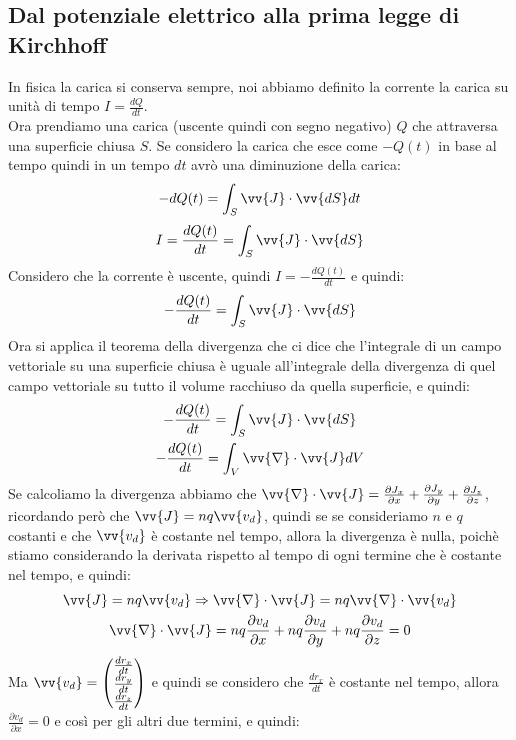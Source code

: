 \documentclass[a4paper, oneside]{article}
\begin{document}
\subsection{Dal potenziale elettrico alla prima legge di Kirchhoff}
In fisica la carica si conserva sempre, noi abbiamo definito la corrente la carica su unità di tempo $I = \frac{dQ}{dt}$.\\
Ora prendiamo una carica (uscente quindi con segno negativo) $Q$ che attraversa una superficie chiusa $S$.
Se considero la carica che esce come $-Q(t)$ in base al tempo quindi in un tempo $dt$ avrò una diminuzione della carica:
\begin{gather*}
    -dQ(t) = \int_S \vv{J} \cdot \vv{dS} dt
\end{gather*}
\begin{gather*}
    I = \frac{dQ(t)}{dt} = \int_S \vv{J} \cdot \vv{dS}
\end{gather*}
Considero che la corrente è uscente, quindi $I = -\frac{dQ(t)}{dt}$ e quindi:
\begin{gather*}
    -\frac{dQ(t)}{dt} = \int_S \vv{J} \cdot \vv{dS}
\end{gather*}
Ora si applica il teorema della divergenza che ci dice che l'integrale di un campo vettoriale su una superficie chiusa è uguale all'integrale della divergenza di quel campo vettoriale su tutto il volume racchiuso da quella superficie, e quindi:  
\begin{gather*}
    -\frac{dQ(t)}{dt} = \int_S \vv{J} \cdot \vv{dS}\\
    -\frac{dQ(t)}{dt} = \int_V \vv{\nabla} \cdot \vv{J} dV\\
\end{gather*}
Se calcoliamo la divergenza abbiamo che $\vv{\nabla} \cdot \vv{J} = \frac{\partial J_x}{\partial x} + \frac{\partial J_y}{\partial y} + \frac{\partial J_z}{\partial z}$, ricordando però che $\vv{J} = n q \vv{v_d}$, quindi se se consideriamo $n$ e $q$ costanti e che $\vv{v_d}$ è costante nel tempo, allora la divergenza è nulla, poichè stiamo considerando la derivata rispetto al tempo di ogni termine che è costante nel tempo, e quindi:
\begin{gather*}
    \vv{J} = n q \vv{v_d} \Rightarrow \vv{\nabla} \cdot \vv{J} = n q \vv{\nabla} \cdot \vv{v_d}\\
    \vv{\nabla} \cdot \vv{J} = nq\frac{\partial v_d}{\partial x} + nq\frac{\partial v_d}{\partial y} + nq\frac{\partial v_d}{\partial z} = 0
\end{gather*}
Ma $\vv{v_d} = \begin{pmatrix}
    \frac{d r_x}{dt}\\
    \frac{d r_y}{dt}\\
    \frac{d r_z}{dt}
\end{pmatrix}$ e quindi se considero che $\frac{d r_x}{dt}$ è costante nel tempo, allora $\frac{\partial v_d}{\partial x} = 0$ e così per gli altri due termini, e quindi:
\end{document}

